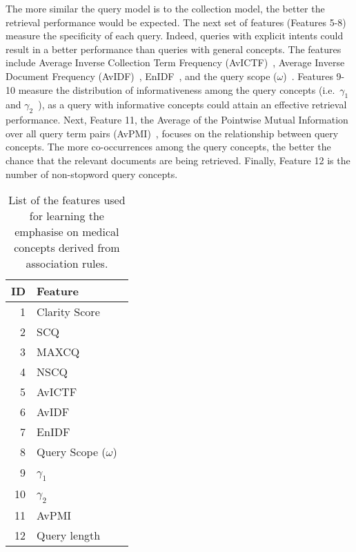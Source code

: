 \documentclass[1p]{elsarticle}
\begin{document}
The more similar the query model is to the collection model, the better the retrieval performance would be expected. The next set of features (Features 5-8) measure the specificity of each query. Indeed, queries with explicit intents could result in a better performance than queries with general concepts. The features include Average Inverse Collection Term Frequency (AvICTF)~\cite{carmel2010sl}, Average Inverse Document Frequency (AvIDF)~\cite{carmel2010sl}, EnIDF~\cite{carmel2010sl}, and the query scope ($\omega$)~\cite{he2006is}. Features 9-10 measure the distribution of informativeness among the query concepts (i.e.\ $\gamma_1$ and $\gamma_2$~\cite{he2006is}), as a query with informative concepts could attain an effective retrieval performance. Next, Feature 11, the Average of the Pointwise Mutual Information over all query term pairs (AvPMI)~\cite{carmel2010sl}, focuses on the relationship between query concepts. The more co-occurrences among the query concepts, the better the chance that the relevant documents are being retrieved.
Finally, Feature 12 is the number of non-stopword query concepts.

\begin{table}[tb]
\caption{List of the features used for learning the emphasise on medical concepts derived from association rules.}
\label{tab:features-c7}   
\centering
\begin{tabular}{|r|l|}
    \hline
    ID & Feature\\ \hline
    1&Clarity Score~\cite{cronen-townsend2002sigir} \\ \hline
    2&SCQ~\cite{zhao2008ecir} \\ \hline
    3&MAXCQ~\cite{zhao2008ecir} \\ \hline
    4&NSCQ~\cite{zhao2008ecir} \\ \hline
    5&AvICTF~\cite{carmel2010sl} \\ \hline
    6&AvIDF~\cite{carmel2010sl} \\ \hline
    7&EnIDF~\cite{carmel2010sl} \\ \hline
    8&Query Scope ($\omega$)~\cite{he2006is} \\ \hline
    9&$\gamma_1$~\cite{he2006is} \\ \hline
    10&$\gamma_2$~\cite{he2006is} \\ \hline
    11&AvPMI~\cite{carmel2010sl} \\ \hline  
    12&Query length~\cite{he2006is}\\ \hline
  \end{tabular}   
\end{table}
\end{document}
